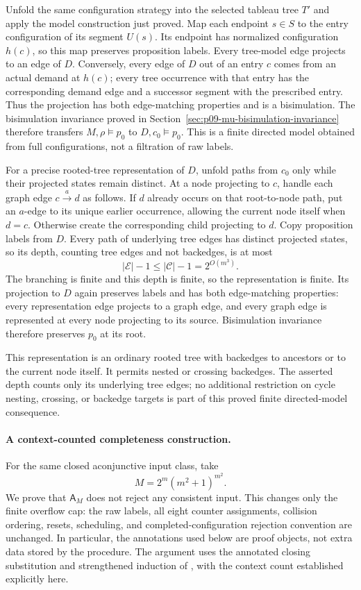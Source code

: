 Unfold the same configuration strategy into the
selected tableau tree \(T'\) and apply the model
construction just proved. Map each endpoint
\(s\in S\) to the entry configuration of its
segment \(U(s)\). Its endpoint has normalized
configuration \(h(c)\), so this map preserves
proposition labels. Every tree-model edge projects
to an edge of \(D\). Conversely, every edge of
\(D\) out of an entry \(c\) comes from an
actual demand at \(h(c)\); every tree occurrence
with that entry has the corresponding demand edge
and a successor segment with the prescribed entry.
Thus the projection has both edge-matching
properties and is a bisimulation. The bisimulation
invariance proved in
Section~\ref{sec:p09-mu-bisimulation-invariance}
therefore transfers \(M,\rho\models p_0\) to
\(D,c_0\models p_0\). This is a finite directed
model obtained from full configurations, not a
filtration of raw labels.

For a precise rooted-tree representation of \(D\),
unfold paths from \(c_0\) only while their
projected states remain distinct. At a node
projecting to \(c\), handle each graph edge
\(c\xrightarrow{a}d\) as follows. If \(d\)
already occurs on that root-to-node path, put an
\(a\)-edge to its unique earlier occurrence,
allowing the current node itself when \(d=c\).
Otherwise create the corresponding child projecting
to \(d\). Copy proposition labels from \(D\).
Every path of underlying tree edges has distinct
projected states, so its depth, counting tree
edges and not backedges, is at most
\[
 |\mathcal E|-1\leq|\mathcal C|-1=2^{O(m^3)}.
\]
The branching is finite and this depth is finite,
so the representation is finite. Its projection
to \(D\) again preserves labels and has both
edge-matching properties: every representation
edge projects to a graph edge, and every graph
edge is represented at every node projecting to
its source. Bisimulation invariance therefore
preserves \(p_0\) at its root.

This representation is an ordinary rooted tree
with backedges to ancestors or to the current
node itself. It permits nested or crossing
backedges. The asserted depth counts only its
underlying tree edges; no additional restriction
on cycle nesting, crossing, or backedge targets
is part of this proved finite directed-model
consequence.

\paragraph{A context-counted completeness construction.}
\label{sec:p09-kozen-context-completeness}
For the same closed aconjunctive input class, take
\[
 M=2^m(m^2+1)^{m^2}.
\]
We prove that \(\mathsf A_M\) does not reject
any consistent input. This changes only the
finite overflow cap: the raw labels, all
eight counter assignments, collision ordering,
resets, scheduling, and completed-configuration
rejection convention are unchanged.
In particular, the annotations used below
are proof objects, not extra data stored
by the procedure. The argument uses the
annotated closing substitution and strengthened
induction of \cite[pp.~347--349]{Kozen1983},
with the context count established explicitly here.

